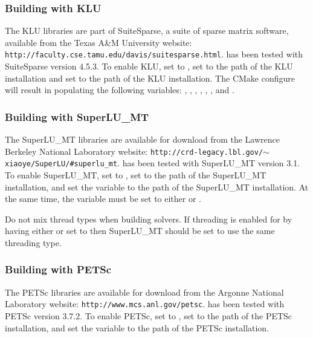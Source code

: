 \subsubsection*{Building with KLU}
The KLU libraries are part of SuiteSparse, a suite of sparse matrix software,
available from the Texas A\&M University website: {\tt http://faculty.cse.tamu.edu/davis/suitesparse.html}.
{\sundials} has been tested with SuiteSparse version 4.5.3.
To enable KLU, set  to , set  to the 
path of the KLU installation and set  to the  path of the KLU installation.
The CMake configure will result in populating the following variables: ,
, , ,
, , and
\newline{}.

\subsubsection*{Building with SuperLU\_MT}
The SuperLU\_MT libraries are available for download from the Lawrence Berkeley National Laboratory website:
{\tt http://crd-legacy.lbl.gov/$\sim$xiaoye/SuperLU/\#superlu\_mt}. 
{\sundials} has been tested with SuperLU\_MT version 3.1. 
To enable SuperLU\_MT, set   to , set 
to the  path of the SuperLU\_MT installation, and set the variable
\newline{} to the  path of the SuperLU\_MT installation.
At the same time, the variable
 must be set to either  or .

\noindent Do not mix thread types when building {\sundials} solvers.
If threading is enabled for {\sundials} by having either  or  set to 
then SuperLU\_MT should be set to use the same threading type.{\warn}

\subsubsection*{Building with PETSc}
The PETSc libraries are available for download from the Argonne National Laboratory website:
{\tt http://www.mcs.anl.gov/petsc}. 
{\sundials} has been tested with PETSc version 3.7.2. 
To enable PETSc, set   to , set 
to the  path of the PETSc installation, and set the variable
 to the  path of the PETSc installation.


